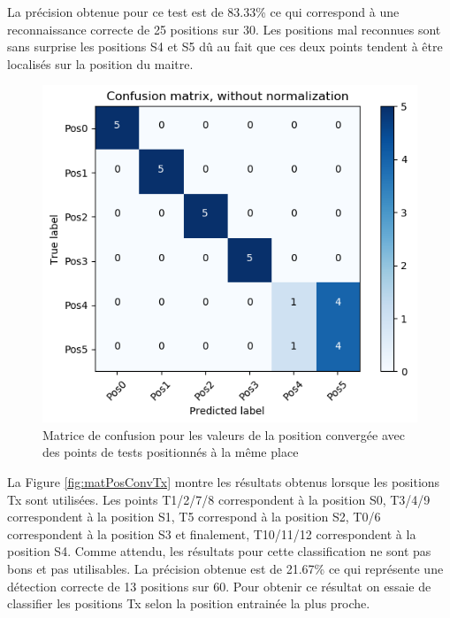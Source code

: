 La précision obtenue pour ce test est de 83.33\% ce qui correspond à une reconnaissance correcte de 25 positions sur 30. Les positions mal reconnues sont sans surprise les positions S4 et S5 dû au fait que ces deux points tendent à être localisés sur la position du maitre.

\begin{figure}[htp]
 \begin{center}
  \includegraphics[scale=0.5]{figures/mat_pos_conv_SxT.png}
  \caption{Matrice de confusion pour les valeurs de la position convergée avec des points de tests positionnés à la même place}
  \label{fig:matPosConvSxT} %
 \end{center}
\end{figure}

La Figure \ref{fig:matPosConvTx} montre les résultats obtenus lorsque les positions Tx sont utilisées. Les points T1/2/7/8 correspondent à la position S0, T3/4/9 correspondent à la position S1, T5 correspond à la position S2, T0/6 correspondent à la position S3 et finalement, T10/11/12 correspondent à la position S4. Comme attendu, les résultats pour cette classification ne sont pas bons et pas utilisables. La précision obtenue est de 21.67\% ce qui représente une détection correcte de 13 positions sur 60. Pour obtenir ce résultat on essaie de classifier les positions Tx selon la position entrainée la plus proche. 

